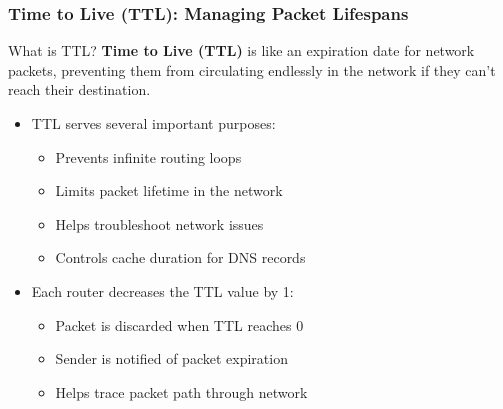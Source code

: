 \documentclass{beamer}
\begin{document}
\begin{frame}
    \frametitle{Time to Live (TTL): Managing Packet Lifespans}
    
    \begin{alertblock}{What is TTL?}
        \textbf{Time to Live (TTL)} is like an expiration date for network packets, preventing them from circulating endlessly in the network if they can't reach their destination.
    \end{alertblock}
    
    \begin{itemize}
        \item TTL serves several important purposes:
        \begin{itemize}
            \item Prevents infinite routing loops
            \item Limits packet lifetime in the network
            \item Helps troubleshoot network issues
            \item Controls cache duration for DNS records
        \end{itemize}
        
        \item Each router decreases the TTL value by 1:
        \begin{itemize}
            \item Packet is discarded when TTL reaches 0
            \item Sender is notified of packet expiration
            \item Helps trace packet path through network
        \end{itemize}
    \end{itemize}
\end{frame}
\end{document}
